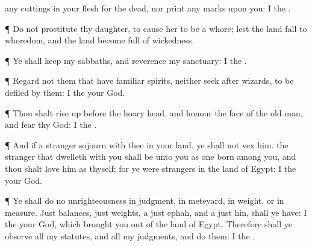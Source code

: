 {any
cuttings in your
flesh for the
dead, nor
print any
marks upon you: I
{} the
{}.
\par }{\PP {}¶ Do not
prostitute thy
daughter, to cause her to be a
whore; lest the
land fall to
whoredom, and the
land become
full of
wickedness.
\par }{\PP {}¶ Ye shall
keep my
sabbaths, and
reverence my
sanctuary: I
{} the
{}.
\par }{\PP {}¶
Regard not them that have familiar
spirits, neither
seek after
wizards, to be
defiled by them: I
{} the
{} your
God.
\par }{\PP {}¶ Thou shalt rise
up
before the hoary
head, and
honour the
face of the old
man, and
fear thy
God: I
{} the
{}.
\par }{\PP {}¶ And if a
stranger
sojourn with thee in your
land, ye shall not
vex him.
 the
stranger that
dwelleth with you shall be unto you as one
born among you, and thou shalt
love him as thyself; for ye were
strangers in the
land of
Egypt: I
{} the
{} your
God.
\par }{\PP {}¶ Ye shall
do no
unrighteousness in
judgment, in
meteyard, in
weight, or in
measure.
Just
balances,
just
weights, a
just
ephah, and a
just
hin, shall ye have: I
{} the
{} your
God, which brought you
out of the
land of
Egypt.
Therefore shall ye
observe all my
statutes, and all my
judgments, and
do them: I
{} the
{}.

}
